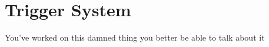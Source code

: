 \chapter{Trigger System} %
    You've worked on this damned thing you better be able to talk about it
